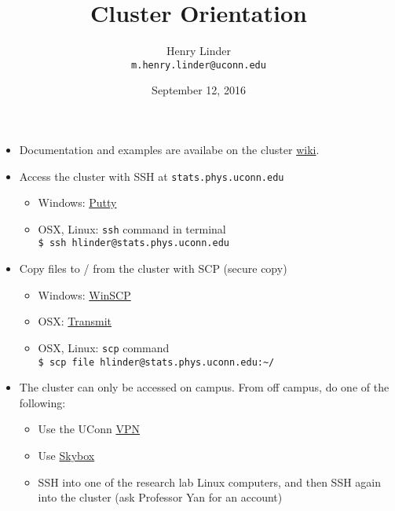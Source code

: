 \documentclass[hyperref={colorlinks,allcolors=blue}]{beamer}
\title{Cluster Orientation}
\author{Henry Linder \\ \footnotesize\texttt{m.henry.linder@uconn.edu}}
\date{September 12, 2016}
\begin{document}
\begin{frame}

  \titlepage

\end{frame}

\begin{frame}

  \begin{itemize}

  \item Documentation and examples are availabe on the cluster
    \href{http://gryphn.phys.uconn.edu/statswiki/index.php/Main_Page}{wiki}.

  \item Access the cluster with SSH at \texttt{stats.phys.uconn.edu}
    \begin{itemize}
    \item Windows: \href{http://www.putty.org/}{Putty}
    \item OSX, Linux: \texttt{ssh} command in terminal \\
      \texttt{\$ ssh hlinder@stats.phys.uconn.edu}
    \end{itemize}

  \item Copy files to / from the cluster with SCP (secure copy)
    \begin{itemize}
    \item Windows: \href{https://winscp.net/eng/index.php}{WinSCP}
    \item OSX: \href{https://panic.com/transmit/}{Transmit}
    \item OSX, Linux: \texttt{scp} command \\
      \texttt{\$ scp file hlinder@stats.phys.uconn.edu:\textasciitilde/}
    \end{itemize}

  \item The cluster can only be accessed on campus. From off campus, do
    one of the following:
    \begin{itemize}
    \item Use the UConn \href{http://remoteaccess.uconn.edu/}{VPN}
    \item Use \href{http://skybox.uconn.edu/}{Skybox}
    \item SSH into one of the research lab Linux computers, and then SSH
      again into the cluster (ask Professor Yan for an account)
    \end{itemize}

  \end{itemize}

\end{frame}
\end{document}
